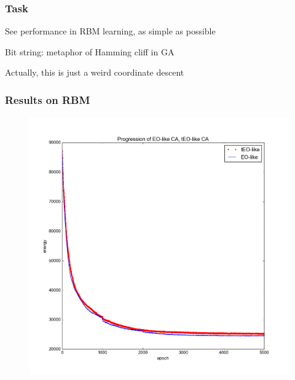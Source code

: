\documentclass{beamer}
\begin{document}
\begin{frame}
  \frametitle{Task}
  See performance in RBM learning, as simple as possible

  Bit string: metaphor of Hamming cliff in GA

  Actually, this is just a weird coordinate descent
\end{frame}

\begin{frame}
  \frametitle{Results on RBM}
  \begin{figure}
    \includegraphics{eo_rbm_unzoomed}
  \end{figure}
\end{frame}
\end{document}
